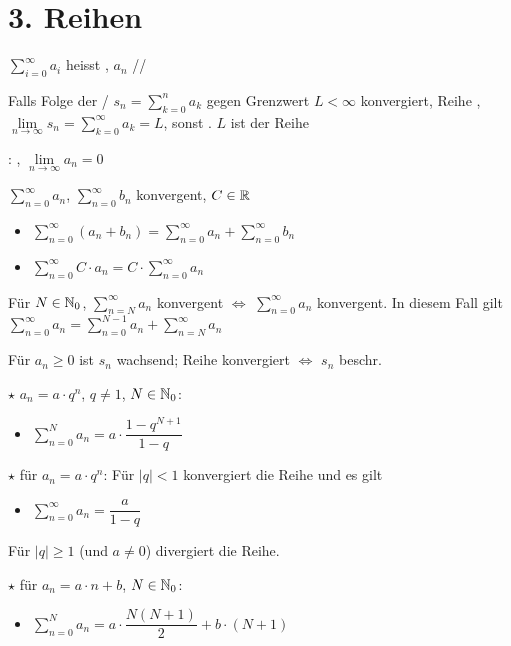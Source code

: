 \section{3. Reihen}

\Def $\sum_{i=0}^{\infty} a_i$ heisst ,
$a_n$ //

\Def Falls Folge der /
$s_n = \sum_{k=0}^{n} a_k$ gegen Grenzwert $L < \infty$ konvergiert,
Reihe , $\lim\limits_{n\to\infty} s_n = \sum_{k=0}^{\infty} a_k = L$,
sonst . $L$ ist  der Reihe

\Satz {}: , $\lim\limits_{n\to\infty} a_n = 0$

\Satz $\sum_{n=0}^{\infty} a_n$, $\sum_{n=0}^{\infty} b_n$ konvergent, $C \in \mathbb{R}$
\vspace{-0.6em}
\begin{itemize}
    \item $\sum_{n=0}^{\infty} (a_n + b_n) = \sum_{n=0}^{\infty} a_n + \sum_{n=0}^{\infty} b_n$
    \item $\sum_{n=0}^{\infty} C \cdot a_n = C \cdot \sum_{n=0}^{\infty} a_n$
\end{itemize}

\Satz Für $N \in \mathbb{N}_0$, $\sum_{n=N}^{\infty} a_n$ konvergent $\iff$ $\sum_{n=0}^{\infty} a_n$ konvergent.
In diesem Fall gilt $\sum_{n=0}^{\infty} a_n = \sum_{n=0}^{N-1} a_n + \sum_{n=N}^{\infty} a_n$

\Satz Für $a_n\ge 0$ ist $s_n$ wachsend; Reihe konvergiert $\iff$ $s_n$ beschr.

\Satz $\star$  $a_n = a \cdot q^n$, $q \ne 1$, $N \in \mathbb{N}_0$:
\vspace{-0.6em}
\begin{itemize}
    \item $\sum_{n=0}^{N} a_n = a \cdot \dfrac{1 - q^{N+1}}{1 - q}$
\end{itemize}

\Satz $\star$  für $a_n = a \cdot q^n$: Für $|q| < 1$ konvergiert die Reihe und es gilt
\vspace{-0.6em}
\begin{itemize}
    \item $\sum_{n=0}^{\infty} a_n = \dfrac{a}{1 - q}$
\end{itemize}
Für $|q| \ge 1$ (und $a \ne 0$) divergiert die Reihe.

\Satz $\star$  für $a_n = a \cdot n + b$, $N \in \mathbb{N}_0$:
\vspace{-0.6em}
\begin{itemize}
    \item $\sum_{n=0}^{N} a_n = a \cdot \dfrac{N(N+1)}{2} + b \cdot (N+1)$
\end{itemize}

